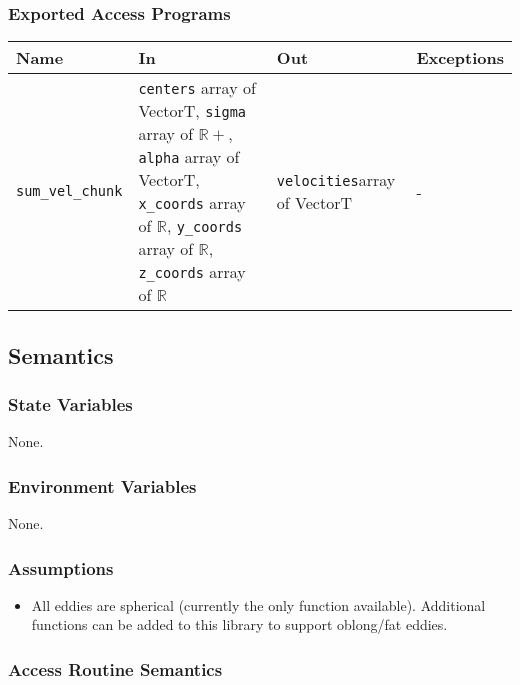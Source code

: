 \documentclass[12pt, titlepage]{article}
\begin{document}
\subsubsection{Exported Access Programs}

\begin{center}
\begin{tabular}{p{2.5cm} p{5cm} p{3cm} p{3cm}}
\hline
\textbf{Name} & \textbf{In} & \textbf{Out} & \textbf{Exceptions} \\
\hline
\texttt{sum\_vel\_chunk} & \texttt{centers} array of VectorT, \newline\texttt{sigma} array of $\mathbb{R+}$, \newline\texttt{alpha} array of VectorT, \newline\texttt{x\_coords} array of $\mathbb{R}$, \newline\texttt{y\_coords} array of $\mathbb{R}$, \newline\texttt{z\_coords} array of $\mathbb{R}$ & \texttt{velocities}\newline array of VectorT & - \\
\hline
\end{tabular}
\end{center}

\subsection{Semantics}

\subsubsection{State Variables}
None.

\subsubsection{Environment Variables}
None.

\subsubsection{Assumptions}
\begin{itemize}
  \item All eddies are spherical (currently the only function available). Additional functions can be added to this library to support oblong/fat eddies. 
\end{itemize}

\subsubsection{Access Routine Semantics}
\end{document}
